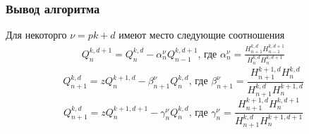 \subsubsection{Вывод алгоритма}
\begin{teor}
Для некоторго $\nu=pk+d$ имеют место следующие соотношения
\begin{eqnarray}
\label{QDExAlpha} Q_n^{k,d+1}=Q_n^{k,d}-\alpha_n^{\nu}
Q_{n-1}^{k,d+1} \mbox{, где }
\alpha_n^{\nu}=\frac{H^{k,d}_{n+1}H_{n-1}^{k,d+1} }{H_{n}^{k,d}
H_{n}^{k,d+1}}
\end{eqnarray}
\begin{equation}
\label{QDExBeta} Q_{n+1}^{k,d} =zQ_n^{k+1,d}-\beta_{n+1}^{{\nu}}
Q_n^{k,d} \mbox{, где } \beta_{n+1}^{\nu}
=\frac{H^{k+1,d}_{n+1}H_{n}^{k,d} }{H_{n+1}^{k,d} H_{n}^{k+1,d}}
\end{equation}
\begin{equation}
\label{QDExGamma} Q_{n+1}^{k,d} =zQ_n^{k+1,d+1}-\gamma_{n}^{\nu}
Q_n^{k,d} \mbox{, где } \gamma_{n}^{\nu}=
\frac{H^{k+1,d}_{n+1}H_{n}^{k,d+1} }{H_{n+1}^{k,d}
H_{n}^{k+1,d+1}}
\end{equation}
\end{teor}
